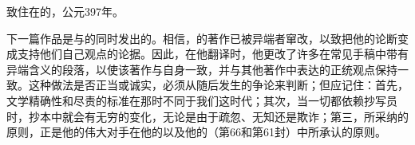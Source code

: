 \par

致住在的，公元397年。\par

下一篇作品是与的同时发出的。相信，的著作已被异端者窜改，以致把他的论断变成支持他们自己观点的论据。因此，在他翻译时，他更改了许多在常见手稿中带有异端含义的段落，以使该著作与自身一致，并与其他著作中表达的正统观点保持一致。这种做法是否正当或诚实，必须从随后发生的争论来判断；但应记住：首先，文学精确性和尽责的标准在那时不同于我们这时代；其次，当一切都依赖抄写员时，抄本中就会有无穷的变化，无论是由于疏忽、无知还是欺诈；第三，所采纳的原则，正是他的伟大对手在他的以及他的（第66和第61封）中所承认的原则。\par

